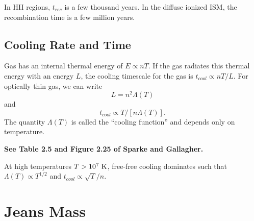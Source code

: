 \documentclass[]{article}
\begin{document}
In HII regions, $t_{rec}$ is a few thousand years.  In the diffuse ionized ISM, the recombination time is a few million years.

\subsection{Cooling Rate and Time}

Gas has an internal thermal energy of $E \propto nT$. If the gas radiates this thermal energy with an energy $L$, the
cooling timescale for the gas is $t_{cool} \propto nT/L$. For optically thin gas, we can write
\begin{equation}
L = n^{2} \Lambda(T)
\end{equation}
\noindent
and
\begin{equation}
t_{cool}  \propto T/[n\Lambda(T)].
\end{equation}
The quantity $\Lambda(T)$ is called the ``cooling function'' and depends only on temperature.

{\bf See Table 2.5 and Figure 2.25 of Sparke and Gallagher.}

At high temperatures $T>10^{7}~\mathrm{K}$, free-free cooling dominates such that $\Lambda(T) \propto T^{1/2}$
and $t_{cool} \propto \sqrt{T}/n$.

\section{Jeans Mass}
\end{document}
